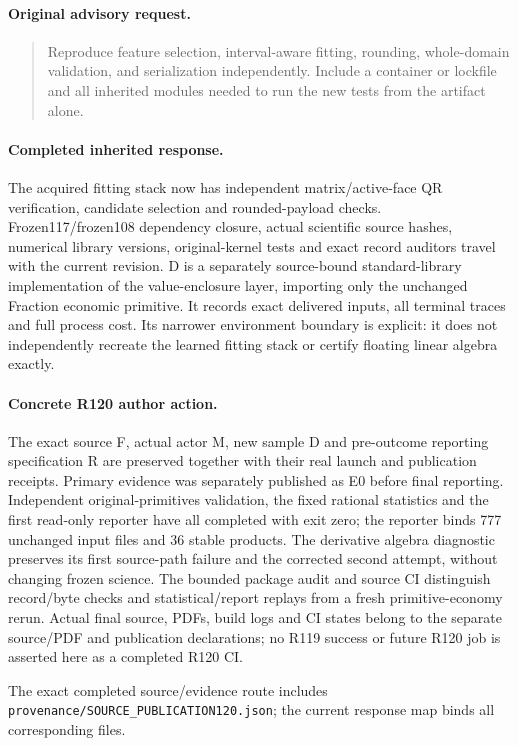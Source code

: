 \paragraph{Original advisory request.}
\begin{quote}
Reproduce feature selection, interval-aware fitting, rounding, whole-domain validation, and serialization independently. Include a container or lockfile and all inherited modules needed to run the new tests from the artifact alone.
\end{quote}
\paragraph{Completed inherited response.}
The acquired fitting stack now has independent matrix/active-face QR verification, candidate selection and rounded-payload checks. Frozen117/frozen108 dependency closure, actual scientific source hashes, numerical library versions, original-kernel tests and exact record auditors travel with the current revision. D is a separately source-bound standard-library implementation of the value-enclosure layer, importing only the unchanged Fraction economic primitive. It records exact delivered inputs, all terminal traces and full process cost. Its narrower environment boundary is explicit: it does not independently recreate the learned fitting stack or certify floating linear algebra exactly.
\paragraph{Concrete R120 author action.}
The exact source F, actual actor M, new sample D and pre-outcome reporting specification R are preserved together with their real launch and publication receipts. Primary evidence was separately published as E0 before final reporting. Independent original-primitives validation, the fixed rational statistics and the first read-only reporter have all completed with exit zero; the reporter binds 777 unchanged input files and 36 stable products. The derivative algebra diagnostic preserves its first source-path failure and the corrected second attempt, without changing frozen science. The bounded package audit and source CI distinguish record/byte checks and statistical/report replays from a fresh primitive-economy rerun. Actual final source, PDFs, build logs and CI states belong to the separate source/PDF and publication declarations; no R119 success or future R120 job is asserted here as a completed R120 CI.

The exact completed source/evidence route includes \nolinkurl{provenance/SOURCE_PUBLICATION120.json}; the current response map binds all corresponding files.
